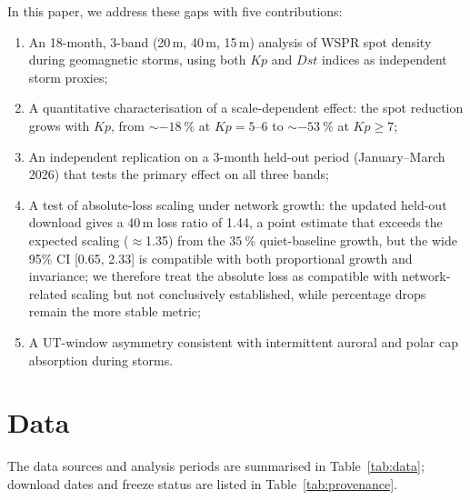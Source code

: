 \documentclass{agujournal2019}
\begin{document}
In this paper, we address these gaps with five contributions:

\begin{enumerate}
	\item An 18-month, 3-band (20\,m, 40\,m, 15\,m) analysis of WSPR spot
	      density during geomagnetic storms, using both $Kp$ and $Dst$ indices
	      as independent storm proxies;
	\item A quantitative characterisation of a scale-dependent effect: the spot
	      reduction grows with $Kp$, from
	      $\sim\SI{-18}{\percent}$ at $Kp = 5\text{--}6$ to $\sim\SI{-53}{\percent}$
	      at $Kp \ge 7$;
	\item An independent replication on a 3-month held-out period
	      (January--March 2026) that tests the primary effect on
	      all three bands;
	\item A test of absolute-loss scaling under network growth: the
	      updated held-out download gives a 40\,m loss ratio of 1.44, a point
	      estimate that exceeds the expected scaling ($\approx$1.35) from
	      the $\SI{+35}{\percent}$ quiet-baseline growth, but the wide
	      95\% CI [0.65, 2.33] is compatible with both proportional growth
	      and invariance; we therefore treat the absolute loss as compatible
	      with network-related scaling but not conclusively established,
	      while percentage drops remain the more stable metric;
	\item A UT-window asymmetry consistent with intermittent auroral and
	      polar cap absorption during storms.
\end{enumerate}


\section{Data}

The data sources and analysis periods are summarised in Table~\ref{tab:data};
download dates and freeze status are listed in Table~\ref{tab:provenance}.
\end{document}
